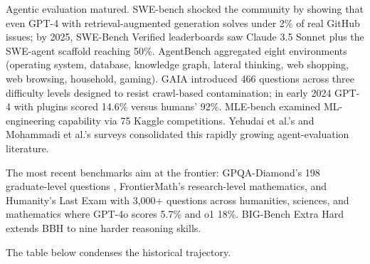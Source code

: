 \documentclass{article}
\begin{document}
Agentic evaluation matured. SWE-bench \cite{jimenez20242024} shocked the community by showing that even GPT-4 with retrieval-augmented generation solves under 2\% of real GitHub issues; by 2025, SWE-Bench Verified leaderboards saw Claude 3.5 Sonnet plus the SWE-agent scaffold \cite{yang20242024} reaching 50\%. AgentBench \cite{liu2023gevalnlgevaluation} aggregated eight environments (operating system, database, knowledge graph, lateral thinking, web shopping, web browsing, household, gaming). GAIA \cite{mialon2024gaiaabenchmarkforg} introduced 466 questions across three difficulty levels designed to resist crawl-based contamination; in early 2024 GPT-4 with plugins scored 14.6\% versus humans' 92\%. MLE-bench \cite{chan20242024} examined ML-engineering capability via 75 Kaggle competitions. Yehudai et al.'s \cite{yehudai20252025} and Mohammadi et al.'s \cite{mohammadi20252025} surveys consolidated this rapidly growing agent-evaluation literature.

The most recent benchmarks aim at the frontier: GPQA-Diamond's 198 graduate-level questions \cite{rein2024gpqaagraduatelevel}, FrontierMath's research-level mathematics, and Humanity's Last Exam \cite{phan20252025} with 3,000+ questions across humanities, sciences, and mathematics where GPT-4o scores 5.7\% and o1 18\%. BIG-Bench Extra Hard \cite{kazemi20252025} extends BBH to nine harder reasoning skills.

The table below condenses the historical trajectory.
\end{document}
